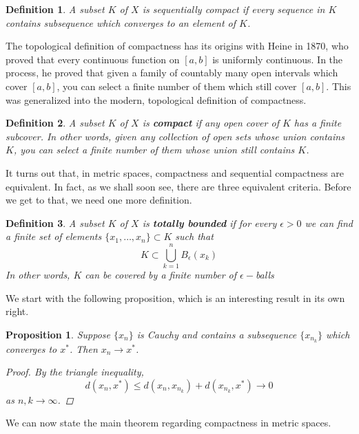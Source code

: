 \documentclass[10pt]{article}         %
\newtheorem{definition}{Definition}[section]
\newtheorem{proposition}{Proposition}[section]
\theoremstyle{remark}
\begin{document}
\begin{definition}
A subset $K$ of $X$ is \emph{sequentially compact} if every sequence in $K$ contains subsequence which converges to an element of $K$.
\end{definition}

The topological definition of compactness has its origins with Heine in 1870, who proved that every continuous function on $[a,b]$ is uniformly continuous. In the process, he proved that given a family of countably many open intervals which cover $[a, b]$, you can select a finite number of them which still cover $[a, b]$. This was generalized into the modern, topological definition of compactness.

\begin{definition}
A subset $K$ of $X$ is \textbf{compact} if any open cover of $K$ has a finite subcover. In other words, given any collection of open sets whose union contains $K$, you can select a finite number of them whose union still contains $K$.
\end{definition}

It turns out that, in metric spaces, compactness and sequential compactness are equivalent. In fact, as we shall soon see, there are three equivalent criteria. Before we get to that, we need one more definition.

\begin{definition}
A subset $K$ of $X$ is \textbf{totally bounded} if for every $\epsilon > 0$ we can find a finite set of elements $\{ x_1, \dots, x_n \} \subset K$ such that 
\[
K \subset \bigcup_{k=1}^n B_\epsilon(x_k)
\]
In other words, $K$ can be covered by a finite number of $\epsilon-$balls
\end{definition}

We start with the following proposition, which is an interesting result in its own right.

\begin{proposition}
Suppose $\{x_n\}$ is Cauchy and contains a subsequence $\{x_{n_k} \}$ which converges to $x^*$. Then $x_n \rightarrow x^*$.
\begin{proof}
By the triangle inequality,
\[
d(x_n, x^*) \leq d(x_n, x_{n_k}) + d(x_{n_k}, x^*) \rightarrow 0
\]
as $n, k \rightarrow \infty$.
\end{proof}
\end{proposition}

We can now state the main theorem regarding compactness in metric spaces.
\end{document}
